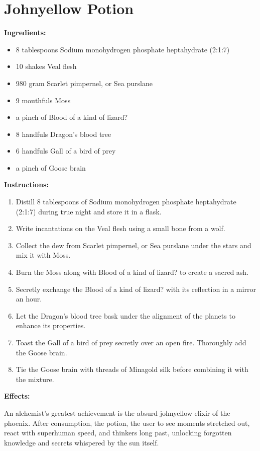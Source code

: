 \documentclass{article}
\begin{document}
\newpage
\section*{Johnyellow Potion}

\textbf{Ingredients:}

\begin{itemize}
  \item 8 tablespoons Sodium monohydrogen phosphate heptahydrate (2:1:7)
  \item 10 shakes Veal flesh
  \item 980 gram Scarlet pimpernel, or Sea purslane
  \item 9 mouthfuls Moss
  \item a pinch of Blood of a kind of lizard?
  \item 8 handfuls Dragon's blood tree
  \item 6 handfuls Gall of a bird of prey
  \item a pinch of Goose brain
\end{itemize}

\textbf{Instructions:}

\begin{enumerate}
  \item Distill 8 tablespoons of Sodium monohydrogen phosphate heptahydrate (2:1:7) during true night and store it in a flask.
  \item Write incantations on the Veal flesh using a small bone from a wolf.
  \item Collect the dew from Scarlet pimpernel, or Sea purslane under the stars and mix it with Moss.
  \item Burn the Moss along with Blood of a kind of lizard? to create a sacred ash.
  \item Secretly exchange the Blood of a kind of lizard? with its reflection in a mirror an hour.
  \item Let the Dragon's blood tree bask under the alignment of the planets to enhance its properties.
  \item Toast the Gall of a bird of prey secretly over an open fire. Thoroughly add the Goose brain.
  \item Tie the Goose brain with threads of Minagold silk before combining it with the mixture.
\end{enumerate}

\textbf{Effects:}

An alchemist's greatest achievement is the absurd johnyellow elixir of the phoenix. After consumption, the potion, the user to see moments stretched out, react with superhuman speed, and thinkers long past, unlocking forgotten knowledge and secrets whispered by the sun itself.
\end{document}
